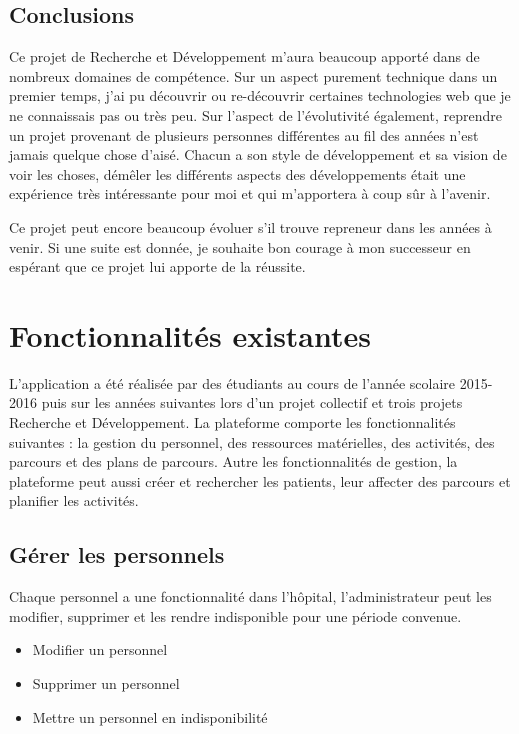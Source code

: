 \documentclass[noposter]{polytech/polytech}
\begin{document}
\section*{Conclusions}

Ce projet de Recherche et Développement m'aura beaucoup apporté dans de nombreux domaines de compétence. Sur un aspect purement technique dans un premier temps, j'ai pu découvrir ou re-découvrir certaines technologies web que je ne connaissais pas ou très peu. Sur l'aspect de l'évolutivité également, reprendre un projet provenant de plusieurs personnes différentes au fil des années n'est jamais quelque chose d'aisé. Chacun a son style de développement et sa vision de voir les choses, démêler les différents aspects des développements était une expérience très intéressante pour moi et qui m'apportera à coup sûr à l'avenir.

Ce projet peut encore beaucoup évoluer s'il trouve repreneur dans les années à venir. Si une suite est donnée, je souhaite bon courage à mon successeur en espérant que ce projet lui apporte de la réussite.


\appendix

\chapter{Fonctionnalités existantes}
\label{ann:foncExist}

L'application a été réalisée par des étudiants au cours de l'année scolaire 2015-2016 puis sur les années suivantes lors d'un projet collectif et trois projets Recherche et Développement. La plateforme comporte les fonctionnalités suivantes : la gestion du personnel, des ressources matérielles, des activités, des parcours et des plans de parcours. Autre les fonctionnalités de gestion, la plateforme peut aussi créer et rechercher les patients, leur affecter des parcours et planifier les activités.


\section{Gérer les personnels}

Chaque personnel a une fonctionnalité dans l'hôpital, l'administrateur peut les modifier, supprimer et les rendre indisponible pour une période convenue.

\begin{itemize}
	\item Modifier un personnel
	\item Supprimer un personnel
	\item Mettre un personnel en indisponibilité
\end{itemize}
\end{document}
